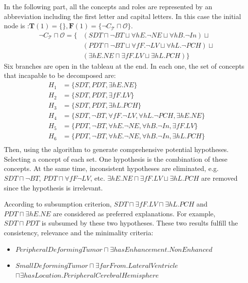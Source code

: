 \documentclass{article}
\begin{document}
In the following part, all the concepts and roles are represented by an abbreviation including the first letter and capital letters.
In this case the initial node is :$\mathbf{T}(1)=\{\}, \mathbf{F}(1)=\{\neg C_\mathcal{T}\sqcap \mathcal{O}\}$.
\begin{align*}
 \neg C_\mathcal{T}\sqcap \mathcal{O}= \{ &(SDT \sqcap \neg BT \sqcup \forall hE. \neg NE \sqcup \forall hB. \neg In) \sqcup \\
 &(PDT \sqcap \neg BT \sqcup \forall fF. \neg LV \sqcup \forall hL. \neg PCH) \sqcup \\
 &(\exists hE. NE \sqcap \exists fF. LV \sqcup \exists hL.PCH )\}
\end{align*}
Six branches are open in the tableau at the end. In each one, the set of concepts that incapable to be decomposed are:
 \begin{align*}
  H_1&=\{ SDT, PDT, \exists hE.NE\}\\
  H_2&=\{ SDT, PDT, \exists fF.LV\}\\
  H_3&=\{ SDT, PDT, \exists hL.PCH\}\\
  H_4&=\{ SDT, \neg BT, \forall fF. \neg LV, \forall hL. \neg PCH, \exists hE.NE\}\\
  H_5&=\{ PDT, \neg BT, \forall hE. \neg NE, \forall hB. \neg In, \exists fF.LV\}\\
  H_6&=\{ PDT, \neg BT, \forall hE. \neg NE, \forall hB. \neg In, \exists hL.PCH\}\\
 \end{align*}
Then, using the algorithm to generate comprehensive potential hypotheses.
Selecting a concept of each set. One hypothesis is the combination of these concepts.
At the same time, inconsistent hypotheses are eliminated, e.g.
 $SDT \sqcap \neg BT$, 
$PDT \sqcap \forall fF \neg LV$, etc.
$\exists hE. NE \sqcap \exists fF. LV \sqcup \exists hL.PCH $
are removed since the hypothesis is irrelevant.

According to subsumption criterion, $SDT \sqcap \exists fF.LV \sqcap \exists hL.PCH$
and $PDT \sqcap \exists hE.NE$ are considered as preferred explanations. For example, 
$SDT \sqcap PDT$ is subsumed by these two hypotheses. 
These two results fulfill the consistency, relevance and the minimality criteria:
\begin{itemize}
 \item $PeripheralDeformingTumor \sqcap \exists hasEnhancement. NonEnhanced$
 \item $SmallDeformingTumor\sqcap \exists farFrom. LateralVentricle $\\ $\sqcap \exists hasLocation. PeripheralCerebralHemisphere$
\end{itemize}




\end{document}

